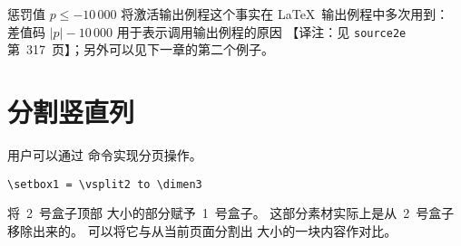 \documentclass{book}
\begin{document}
惩罚值 $p\leq-10\,000$ 将激活输出例程这个事实在 \LaTeX\ 输出例程中多次用到：
差值码 $\mathopen|p\mathclose|-10\,000$ 用于表示调用输出例程的原因%
【译注：见 \verb|source2e| 第~317~页】；另外可以见下一章的第二个例子。


\section{分割竖直列}
\label{vsplit}

用户可以通过  命令实现分页操作。

\begin{example}
\begin{verbatim}
\setbox1 = \vsplit2 to \dimen3
\end{verbatim}
将~2~号盒子顶部  大小的部分赋予~1~号盒子。
这部分素材实际上是从~2~号盒子移除出来的。
可以将它与从当前页面分割出  大小的一块内容作对比。
\end{example}
\end{document}
